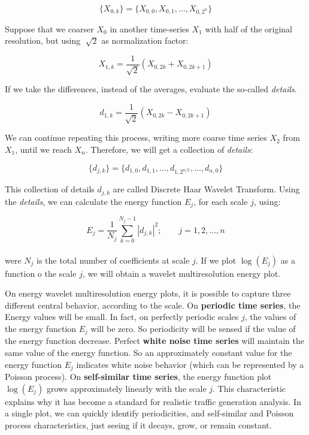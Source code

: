 \begin{equation}
\{X_{0,k}\} = \{ X_{0,0}, X_{0,1}, ... ,X_{0,2^{n}} \}
\end{equation} 

Suppose that we coarser $X_{0}$ in another time-series $X_{1}$ with half of the original resolution, but using  $ \sqrt[]{2} $ as normalization factor:

\begin{equation}
X_{1,k} = \frac{1}{\sqrt{2}}(X_{0,2k} + X_{0,2k+1})
\end{equation}

If we take the differences, instead of the averages, evaluate the so-called \textit{details}.

\begin{equation}
d_{1,k} = \frac{1}{\sqrt{2}}(X_{0,2k} - X_{0,2k+1})
\end{equation}

We can continue repeating this process, writing more coarse time series $X_{2}$ from $X_{1}$, until we reach $X_{n}$. Therefore, we will get a collection of \textit{details}:

\begin{equation}
\{d_{j,k}\} = \{ d_{1,0}, d_{1,1}, ..., d_{1,2^{n/2}}, ..., d_{n, 0} \}
\end{equation}

This collection of details ${d_{j,k}}$ are called Discrete Haar Wavelet Transform. Using the \textit{details}, we can calculate the energy function $E_{j}$, for each scale $j$, using:

\begin{equation}
E_{j} = \frac{1}{N_{j}} \sum_{k = 0}^{N_{j} - 1} |d_{j,k}|^{2}; \qquad j = 1, 2, ..., n
\end{equation} 
\\ 
were $N_{j}$ is the total number of coefficients at scale $j$. If we plot $\log(E_{j})$ as a function o the scale $j$, we will obtain a wavelet multiresolution energy plot.

On energy wavelet multiresolution energy plots, it is possible to capture three different central behavior, according to the scale. On \textbf{periodic time series}, the Energy values will be small. In fact, on perfectly periodic scales $j$, the values of the energy function $E_{j}$ will be zero. So periodicity will be sensed if the value of the energy function decrease. Perfect \textbf{white noise time series} will maintain the same value of the energy function. So an approximately constant value for the energy function $E_{j}$ indicates white noise behavior (which can be represented by a Poisson process\cite{poisson-white-noise}). On \textbf{self-similar time series}, the energy function plot $\log(E_{j})$ grows approximately linearly with the scale $j$. This characteristic explains why it has become a standard for realistic traffic generation analysis. In a single plot, we can quickly identify periodicities, and self-similar and Poisson process characteristics, just seeing if it decays, grow, or remain constant.

